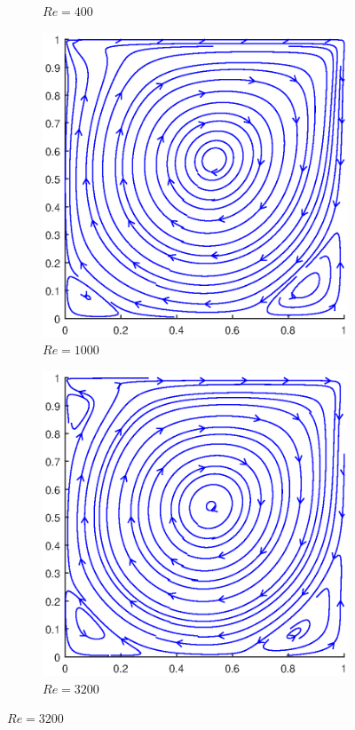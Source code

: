 \begin{figure}[H]
\begin{subfigure}{0.5\textwidth}
		\caption{$Re=400$}
	\end{subfigure}
	\begin{subfigure}{0.5\textwidth}
		\includegraphics[scale=0.61]{DrivenCavity/1000}
		\caption{$Re=1000$}
	\end{subfigure}%
	\begin{subfigure}{0.5\textwidth}
		\includegraphics[scale=0.61]{DrivenCavity/3200}
		\caption{$Re=3200$}
	\end{subfigure}
\end{figure}
